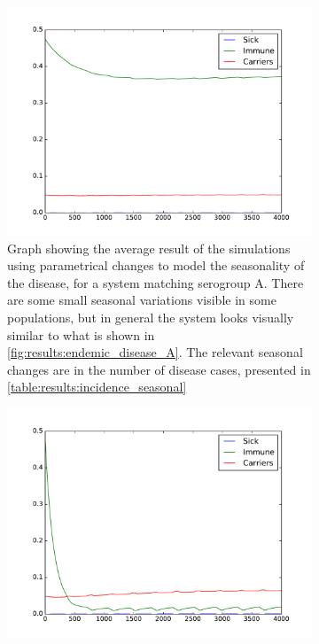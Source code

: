 \documentclass[10pt,a4paper]{article}
\begin{document}
\begin{figure}
	\centering
	\begin{subfigure}{0.45\textwidth}
		\includegraphics[width=\textwidth]{figures/disease_A_seasonal}
		\caption{Graph showing the average result of the simulations using parametrical changes to model the seasonality of the disease, for a system matching serogroup A. There are some small seasonal variations visible in some populations, but in general the system looks visually similar to what is shown in \cref{fig:results:endemic_disease_A}. The relevant seasonal changes are in the number of disease cases, presented in \cref{table:results:incidence_seasonal}} \label{fig:results:seasonal_disease_A_parameters}
	\end{subfigure}
	\begin{subfigure}{0.45\textwidth}
		\includegraphics[width=\textwidth]{figures/disease_W135_seasonal}

\end{subfigure}
\end{figure}
\end{document}

